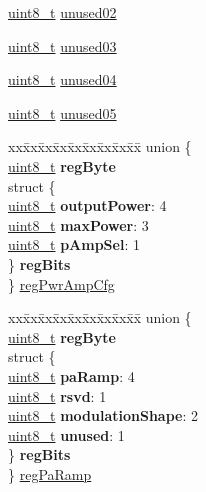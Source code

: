 \begin{DoxyCompactItemize}
\begin{tabbing}
\end{tabbing}\item 
\hyperlink{vl53l0x__types_8h_aba7bc1797add20fe3efdf37ced1182c5}{uint8\+\_\+t} \hyperlink{structFSK__Register__Map_a85a8bc3f4fb36cb6aef3c265c23bc252}{unused02}
\item 
\hyperlink{vl53l0x__types_8h_aba7bc1797add20fe3efdf37ced1182c5}{uint8\+\_\+t} \hyperlink{structFSK__Register__Map_aa908432d1dbffcb64dbf8552da6dad22}{unused03}
\item 
\hyperlink{vl53l0x__types_8h_aba7bc1797add20fe3efdf37ced1182c5}{uint8\+\_\+t} \hyperlink{structFSK__Register__Map_ae27a2e44c6d1716aa2772ccb7b4a1968}{unused04}
\item 
\hyperlink{vl53l0x__types_8h_aba7bc1797add20fe3efdf37ced1182c5}{uint8\+\_\+t} \hyperlink{structFSK__Register__Map_a849022a1aa6af4524f2d10da17ea0171}{unused05}
\item 
\begin{tabbing}
xx\=xx\=xx\=xx\=xx\=xx\=xx\=xx\=xx\=\kill
union \{\\
\>\hyperlink{vl53l0x__types_8h_aba7bc1797add20fe3efdf37ced1182c5}{uint8\_t} {\bfseries regByte}\\
\>struct \{\\
\>\>\hyperlink{vl53l0x__types_8h_aba7bc1797add20fe3efdf37ced1182c5}{uint8\_t} {\bfseries outputPower}: 4\\
\>\>\hyperlink{vl53l0x__types_8h_aba7bc1797add20fe3efdf37ced1182c5}{uint8\_t} {\bfseries maxPower}: 3\\
\>\>\hyperlink{vl53l0x__types_8h_aba7bc1797add20fe3efdf37ced1182c5}{uint8\_t} {\bfseries pAmpSel}: 1\\
\>\} {\bfseries regBits}\\
\} \hyperlink{structFSK__Register__Map_a780d92c96bfd626d675d4406dd2dc742}{regPwrAmpCfg}\\

\end{tabbing}\item 
\begin{tabbing}
xx\=xx\=xx\=xx\=xx\=xx\=xx\=xx\=xx\=\kill
union \{\\
\>\hyperlink{vl53l0x__types_8h_aba7bc1797add20fe3efdf37ced1182c5}{uint8\_t} {\bfseries regByte}\\
\>struct \{\\
\>\>\hyperlink{vl53l0x__types_8h_aba7bc1797add20fe3efdf37ced1182c5}{uint8\_t} {\bfseries paRamp}: 4\\
\>\>\hyperlink{vl53l0x__types_8h_aba7bc1797add20fe3efdf37ced1182c5}{uint8\_t} {\bfseries rsvd}: 1\\
\>\>\hyperlink{vl53l0x__types_8h_aba7bc1797add20fe3efdf37ced1182c5}{uint8\_t} {\bfseries modulationShape}: 2\\
\>\>\hyperlink{vl53l0x__types_8h_aba7bc1797add20fe3efdf37ced1182c5}{uint8\_t} {\bfseries unused}: 1\\
\>\} {\bfseries regBits}\\
\} \hyperlink{structFSK__Register__Map_abacc022fe75b4791c52a1c0549ee45f9}{regPaRamp}\\


\end{tabbing}
\end{DoxyCompactItemize}
